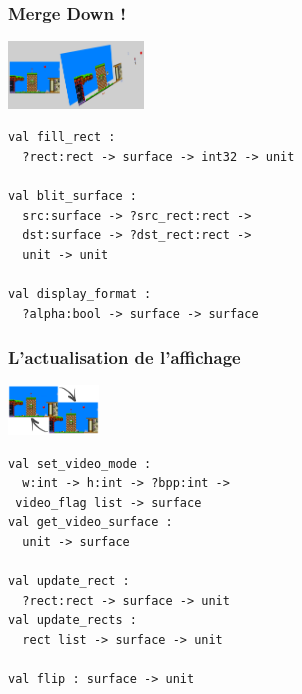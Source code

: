 \begin{frame}[fragile]
	\frametitle{\og{}Merge Down !\fg}
	\begin{center}
		\includegraphics[width=3.6cm]{pics/surfacesMerge.png}
	\end{center}
	\begin{lstlisting}
val fill_rect : 
  ?rect:rect -> surface -> int32 -> unit

val blit_surface : 
  src:surface -> ?src_rect:rect -> 
  dst:surface -> ?dst_rect:rect -> 
  unit -> unit

val display_format : 
  ?alpha:bool -> surface -> surface
	\end{lstlisting}
\end{frame}

\begin{frame}[fragile]
	\frametitle{L'actualisation de l'affichage}
	\begin{center}
		\includegraphics[width=2.4cm]{pics/doubleBufferScreen.png}
	\end{center}
	\begin{lstlisting}
val set_video_mode : 
  w:int -> h:int -> ?bpp:int -> 
 video_flag list -> surface
val get_video_surface : 
  unit -> surface

val update_rect : 
  ?rect:rect -> surface -> unit
val update_rects : 
  rect list -> surface -> unit

val flip : surface -> unit
	\end{lstlisting}
\end{frame}
